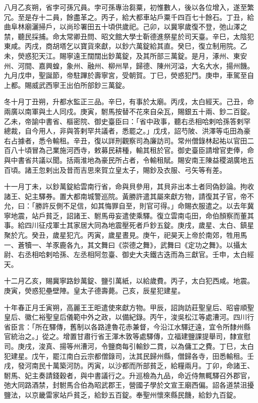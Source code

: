 \begin{pinyinscope}
 八月乙亥朔，省孛可孫冗員。孛可孫專治芻粟，初惟數人，後以各位增入，遂至繁冗。至是存十二員，餘盡革之。丙子，給大都車站戶粟千四百七十餘石。丁丑，給曲阜林廟灑掃戶，以尚珍署田五十頃供歲祀。己卯，以冀寧歲復不登，弛山澤之禁，聽民採捕。命太常卿丑問、昭文館大學士靳德進祭星於司天臺。辛巳，太陰犯東咸。丙戌，商胡塔乞以寶貨來獻，以鈔六萬錠給其直。癸巳，復立制用院。乙未，熒惑犯天江。賜寧遠王闊闊出鈔萬錠，及其所部三萬錠。是月，涿州、東安州、河間、嘉興蝗，象州、融州、柳州旱，歸德、陳州河溢，大名大水，揚州饑。九月戊申，聖誕節，帝駐蹕於壽寧宮，受朝賀。丁巳，熒惑犯鬥。庚申，車駕至自上都。賜威武西寧王出伯所部鈔三萬錠。



 冬十月丁丑朔，升都水監正三品。辛巳，有事於太廟。丙戌，太白經天。己丑，命兩廣以南軍與土人同戍。庚寅，駙馬按替不花來自朵瓦，賜銀五十兩、鈔二百錠。乙未，帝諭中書省、樞密院、御史臺臣曰：「省中政事，聽右丞相哈剌哈孫答剌罕總裁，自今用人，非與答剌罕共議者，悉罷之。」戊戌，詔芍陂、洪澤等屯田為豪右占據者，悉令輸租。辛丑，復以詳刑觀察司為廉訪司。常州僧錄林起祐以官田二百八十頃冒為己業施河西寺，敕募民耕種，輸其租於官。御史臺臣請增官吏俸，命與中書省共議以聞。括兩淮地為豪民所占者，令輸租賦。賜安南王陳益稷湖廣地五百頃。諸王忽剌出及昔而吉思來賀立皇太子，賜鈔及衣服、弓矢等有差。



 十一月丁未，以鈔萬錠給雲南行省，命與貝參用，其貝非出本土者同偽鈔論。拘收諸王、妃主驛券。置大都南城警巡院。黃勝許遣其屬來獻方物，請復其子官，帝不允，曰：「勝許反側不足信，如其悔罪自至，則官可得。」命賜衣服遣之。以去年冀寧地震，站戶貧乏，詔諸王、駙馬毋妄遣使乘驛。復立雲南屯田，命伯顏察而董其事。給四川征戍軍士其家居大同為地震壓死者戶鈔五錠。庚戌，歲星、太白、鎮星聚於亢。癸丑，歲星犯亢。丙寅，歲星晝見。庚午，祀昊天上帝於南郊，牲用馬一、蒼犢一、羊豕鹿各九，其文舞曰《崇德之舞》，武舞曰《定功之舞》。以攝太尉、右丞相哈剌哈孫、左丞相阿忽臺、御史大夫鐵古迭而為三獻官。壬申，太白經天。



 十二月乙亥，賜冀寧路鈔萬錠、鹽引萬紙，以給歲費。丙子，太白犯西咸。地震。庚寅，熒惑犯壘壁陣。皇太子德壽薨。己亥，辰星犯建星。



 十年春正月壬寅朔，高麗王王昛遣使來獻方物。甲辰，詔詢訪莊聖皇后、昭睿順聖皇后、徽仁裕聖皇后儀範中外之政，以備紀錄。丙午，浚吳松江等處漕河。四川行省臣言：「所在驛傳，舊制以各路達魯花赤兼督，今沿江水驛迂遠，宜令所隸州縣官統治之。」從之。增置甘肅行省王渾木敦等處驛傳，立福建鹽課提舉司，隸宣慰司。庚戌，浚真、揚等州漕河，令鹽商每引輸鈔二貫，以為傭工之費。丁巳，太白犯建星。戊午，罷江南白云宗都僧錄司，汰其民歸州縣，僧歸各寺，田悉輸租。壬戌，發河南民十萬築河防。丙寅，以沙都而所部貧乏，給糧兩月。丁卯，命諸王、駙馬、妃主奏請錢穀者，與中書議行之。升巡檢為九品，命近侍無輒驛召外郡官，弛大同路酒禁，封駙馬合伯為昭武郡王，營國子學於文宣王廟西偏。詔各道禁沮擾鹽法，以京畿雷家站戶貧乏，給鈔五百錠。奉聖州懷來縣民饑，給鈔九百錠。




\end{pinyinscope}
